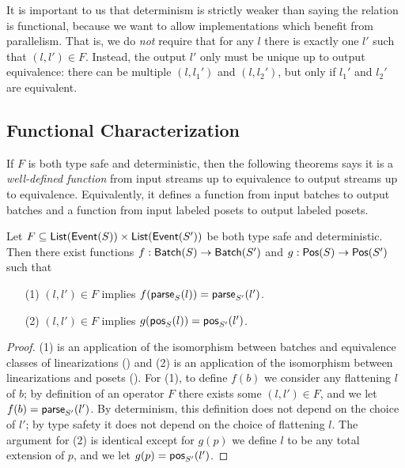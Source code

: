 It is important to us that determinism is strictly weaker than saying the relation is functional, because we want to allow implementations which benefit from parallelism. That is, we do \emph{not} require that for any $l$ there is exactly one $l'$ such that $(l, l') \in F$. Instead, the output $l'$ only must be unique up to output equivalence: there can be multiple $(l, l_1')$ and $(l, l_2')$, but only if $l_1'$ and $l_2'$ are equivalent.

\subsection{Functional Characterization}

If $F$ is both type safe and deterministic, then the following theorems says it is a \emph{well-defined function} from input streams up to equivalence to output streams up to equivalence.
Equivalently, it defines a function from input batches to output batches
and a function from input labeled posets to output labeled posets.

\begin{theorem}
\label{thm:type-safe-and-deterministic-consequence}
Let $F \subseteq \listtype{\event{S}} \times \listtype{\event{S'}}$ be both type safe and deterministic.
Then there exist functions $f: \batch{S} \to \batch{S'}$ and $g: \poset{S} \to \poset{S'}$
such that
\begin{enumerate}
\item[(1)] $(l, l') \in F$ implies $f(\parselin{l}{S}) = \parselin{l'}{S'}$.
\item[(2)] $(l, l') \in F$ implies $g(\posetlin{l}{S}) = \posetlin{l'}{S'}$.
\end{enumerate}
\end{theorem}
\begin{proof}
(1) is an application of the isomorphism between batches and equivalence classes of linearizations () and (2) is an application of the isomorphism between linearizations and posets ().
For (1), to define $f(b)$ we consider any flattening $l$ of $b$; by definition of an operator $F$ there exists some $(l, l') \in F$, and we let $f(b) = \parselin{l'}{S'}$. By determinism, this definition does not depend on the choice of $l'$; by type safety it does not depend on the choice of flattening $l$.
The argument for (2) is identical except for $g(p)$ we define $l$ to be any total extension of $p$, and we let $g(p) = \posetlin{l'}{S'}$.
\end{proof}

